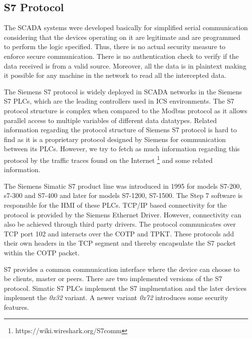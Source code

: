 \documentclass[article,msc=informatik,type=msc,colorback,accentcolor=tud9c]{tudthesis}
\begin{document}
    \vspace{5mm} 
    
    
    \subsection{S7 Protocol}
    
    
    The SCADA systems were developed basically for simplified serial communication considering that the devices operating on it are legitimate and are programmed to perform the logic specified. Thus, there is no actual security measure to enforce secure communication. There is no authentication check to verify if the data received is from a valid source. Moreover, all the data is in plaintext making it possible for any machine in the network to read all the intercepted data.
    
    \vspace{3mm}
    The Siemens S7 protocol is widely deployed in \ac{SCADA} networks in the Siemens S7 \ac{PLC}s, which are the leading controllers used in \ac{ICS} environments. The S7 protocol structure is complex when compared to the Modbus protocol as it allows parallel access to multiple variables of different data datatypes. 
    Related information regarding the protocol structure of Siemens S7 protocol is hard to find as it is a proprietary protocol designed by Siemens for communication between its \ac{PLC}s. However, we try to fetch as much information regarding this protocol by the traffic traces found on the Internet \footnote{https://wiki.wireshark.org/S7comm} and some related information.\cite{kleinmann2014accurate} 
     
     
     \vspace{3mm}  
    The Siemens Simatic S7 product line was introduced in 1995 for models S7-200, s7-300 and S7-400 and later for models S7-1200, S7-1500. The Step 7 software is responsible for the \ac{HMI} of these \ac{PLC}s. TCP/IP based connectivity for the protocol is provided by the Siemens Ethernet Driver. However, connectivity can also be achieved through third party drivers. The protocol communicates over \ac{TCP} port 102 and interacts over the \ac{COTP} and TPKT\cite{pouffary1997iso}. These protocols add their own headers in the TCP segment and thereby encapsulate the S7 packet within the \ac{COTP} packet. 
     
     
     \vspace{3mm}
    S7 provides a common communication interface where the device can choose to be clients, master or peers. There are two implemented versions of the S7 protocol. Simatic S7 \ac{PLC}s implement the S7 implmentation and the later devices implement the \textit{0x32} variant. A newer variant \textit{0x72} introduces some security features. 
    
\end{document}
